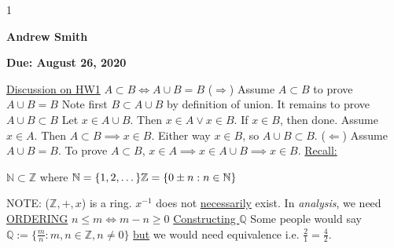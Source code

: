 \documentclass[12pt]{article}
\newcommand{\duedate}{August 26, 2020}
\newcommand{\yourname}{Andrew Smith}
\def\printsolutions{1}
\newcommand{\N}{\mathbb{N}}
\newcommand{\Z}{\mathbb{Z}}
\newcommand{\Q}{\mathbb{Q}}
\begin{document}
\if\printsolutions1
\begin{center}
\textbf{\Large \yourname}
\end{center}
\else
\begin{center}
\textbf{\Large Due: \duedate}
\end{center}
\fi

\begin{solution}\newline
\underline{Discussion on HW1}\newline
$A\subset B\iff A\cup B=B$\newline
($\Rightarrow$) Assume $A\subset B$ to prove $A\cup B=B$\newline
Note first $B\subset A\cup B$ by definition of union.\newline
It remains to prove $A\cup B\subset B$\newline
Let $x\in A\cup B$. Then $x\in A\lor x\in B$. If $x\in B$, then done.\newline
Assume $x\in A$. Then $A\subset B\implies x\in B$.\newline
Either way $x\in B$, so $A\cup B\subset B$.\newline
($\Leftarrow$) Assume $A\cup B= B$. To prove $A\subset B$, $x\in A\implies x\in A\cup B\implies x\in B$.\newline
\underline{Recall:}\newline
\begin{center}
    $\N\subset\Z$ where \newline
    $\N = \{1,2,\dots\}\newline
    \Z=\{0\pm n:n\in \N\}\newline$
\end{center}\newline
NOTE: ($\Z,+,x$) is a ring.
    $x^{-1}$ does not \underline{necessarily} exist.\newline
    In \textit{analysis}, we need \underline{ORDERING}\newline
    $n\leq m \iff m-n\geq0$\newline
    \underline{Constructing $\Q$}\newline
    Some people would say\newline
    $\Q:=\{\frac{m}{n}:m,n\in\Z,n\neq0\}$\newline
    \underline{but} we would need equivalence\newline
    i.e. $\frac{2}{1}=\frac{4}{2}$.\newline

\end{solution}
\end{document}
